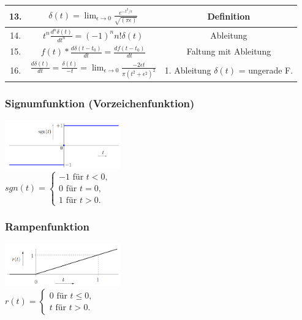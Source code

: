 \begin{multicols}{2}
{\begin{tabular}{ccc}
      \hline
      13. & $\delta(t) = \lim _{\epsilon \to 0} \frac{e^{-t^2/\epsilon}}{\sqrt{(\pi \epsilon)}} $                                & Definition                             \\
      \hline
      14. & $t^n \frac{d^n \delta(t)}{dt^n} = (-1)^n n! \delta(t)$                                                               & Ableitung                              \\
      \hline
      15. & $f(t) * \frac{d\delta(t-t_0)}{dt} = \frac{df(t-t_0)}{dt}$                                                            & Faltung mit Ableitung                  \\
      \hline
      16. & $\frac{d\delta(t)}{dt} = \frac{\delta(t)}{-t} = \lim _{\epsilon \to 0} \frac{-2\epsilon t}{\pi(t^2 + \epsilon^2)^2}$ & 1. Ableitung $\delta(t)$ = ungerade F. \\
      \hline
    \end{tabular}}
  \subsubsection*{Signumfunktion (Vorzeichenfunktion)}
  \includegraphics[width = 5cm]{include/Wichtige Funktionen/img/Signumfunktion.png}
  \footnotesize
  \\ $sgn(t) = \begin{cases}
      -1 \textrm{ für }  t<0,  \\
      0 \textrm{ für }  t = 0, \\
      1 \textrm{ für }  t >0.
    \end{cases}   $                                                          \\
  \subsubsection*{Rampenfunktion}
  \includegraphics[width=5cm]{include/Wichtige Funktionen/img/Rampenfunktion.png}
  \footnotesize
  \\ $r(t) = \begin{cases}
      0 \textrm{ für } t \leq 0, \\
      t \textrm{ für } t > 0.
    \end{cases}$                                                          \\

\end{multicols}
